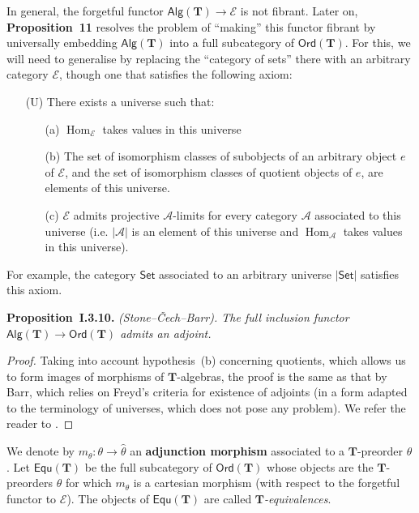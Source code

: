 \documentclass{article}
\newenvironment{itenv}[1]
  {\phantomsection\par\medskip\noindent\textbf{#1.}\itshape}
  {\par\medskip}
\newcommand{\oldpage}[1]{\marginpar{\footnotesize$\Big\vert$ \textit{p.~#1}}}
\newcommand{\unsure}[1]{{\color{purple}\textbf{#1}}}
\newcommand{\TT}{\mathbf{T}}
\newcommand{\cat}[1]{\mathcal{#1}}
\newcommand{\Cat}[1]{\mathsf{#1}}
\newcommand{\set}[1]{|#1|}
\newcommand{\Alg}[1]{\Cat{Alg}(#1)}
\newcommand{\Ord}[1]{\Cat{Ord}(#1)}
\newcommand{\Equ}[1]{\Cat{Equ}(#1)}
\DeclareMathOperator{\Hom}{Hom}
\begin{document}
In general, the forgetful functor $\Alg{\TT}\to\cat{E}$ is not fibrant.
Later on, \unsure{Proposition~11} resolves the problem of ``making'' this functor fibrant by universally embedding $\Alg{\TT}$ into a full subcategory of $\Ord{\TT}$.
For this, we will need to generalise \cite[Proposition~2.4]{Ba} by replacing the ``category of sets'' there with an arbitrary category $\cat{E}$, though one that satisfies the following axiom:
\begin{enumerate}
  \item[(U)] There exists a universe such that:
    \begin{enumerate}
      \item[(a)] $\Hom_\cat{E}$ takes values in this universe

      \item[(b)] The set of isomorphism classes of subobjects of an arbitrary object $e$ of $\cat{E}$, and the set of isomorphism classes of quotient objects of $e$, are elements of this universe.

      \item[(c)] $\cat{E}$ admits projective $\cat{A}$-limits for every category $\cat{A}$ associated to this universe (i.e. $\set{\cat{A}}$ is an element of this universe and $\Hom_\cat{A}$ takes values in this universe).
    \end{enumerate}
\end{enumerate}

\oldpage{241}
For example, the category $\Cat{Set}$ associated to an arbitrary universe $\set{\Cat{Set}}$ satisfies this axiom.

\begin{itenv}{Proposition~I.3.10}
  \emph{(Stone--Čech--Barr).}
  The full inclusion functor $\Alg{\TT}\to\Ord{\TT}$ admits an adjoint.
\end{itenv}

\begin{proof}
  Taking into account hypothesis~(b) concerning quotients, which allows us to form images of morphisms of $\TT$-algebras, the proof is the same as that by Barr, which relies on Freyd's criteria for existence of adjoints (in a form adapted to the terminology of universes, which does not pose any problem).
  We refer the reader to \cite{Ba}.
\end{proof}

We denote by $m_\theta\colon\theta\to\hat{\theta}$ an \unsure{adjunction morphism} associated to a $\TT$-preorder $\theta$.
Let $\Equ{\TT}$ be the full subcategory of $\Ord{\TT}$ whose objects are the $\TT$-preorders $\theta$ for which $m_\theta$ is a cartesian morphism (with respect to the forgetful functor to $\cat{E}$).
The objects of $\Equ{\TT}$ are called \emph{$\TT$-equivalences}.
\end{document}
